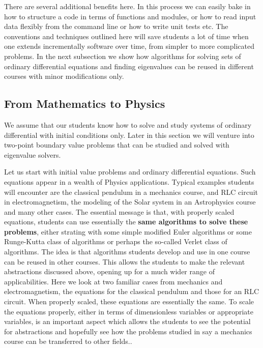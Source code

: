\documentclass[graybox,envcountchap,sectrefs]{svmult}
\begin{document}
There are several additional benefits here. In
this process we can easily bake in how to structure a code in terms of
functions and modules, or how to read input data flexibly from the
command line or how to write unit tests etc.  The conventions and
techniques outlined here will save students a lot of time when one
extends incrementally software over time, from simpler to more
complicated problems. In the next subsection we show how algorithms
for solving sets of ordinary differential equations and finding
eigenvalues can be reused in different courses with minor
modifications only.



\subsection{From Mathematics to Physics}

We assume that our students know how to solve and study systems of
ordinary differential with initial conditions only. Later in this
section we will venture into two-point boundary value problems that
can be studied and solved with eigenvalue solvers.

Let us start with initial value problems and ordinary differential
equations. Such equations appear in a wealth of Physics
applications. Typical examples students will encounter are the
classical pendulum in a mechanics course, and RLC circuit in
electromagnetism, the modeling of the Solar system in an Astrophysics
course and many other cases.  The essential message is that, with
properly scaled equations, students can use essentially the
\textbf{same algorithms to solve these problems}, either strating with
some simple modified Euler algorithms or some Runge-Kutta class of
algorithms or perhaps the so-called Verlet class of algorithms. The
idea is that algorithms students develop and use in one course can be
reused in other courses.  This allows the students to make the
relevant abstractions discussed above, opening up for a much wider
range of applicabilities. Here we look at two familiar cases from
mechanics and electromagnetism, the equations for the classical
pendulum and those for an RLC circuit.  When properly scaled, these
equations are essentially the same. To scale the equations properly,
either in terms of dimensionless variables or appropriate variables,
is an important aspect which allows the students to see the potential
for abstractions and hopefully see how the problems studied in say a
mechanics course can be transferred to other fields..
\end{document}
